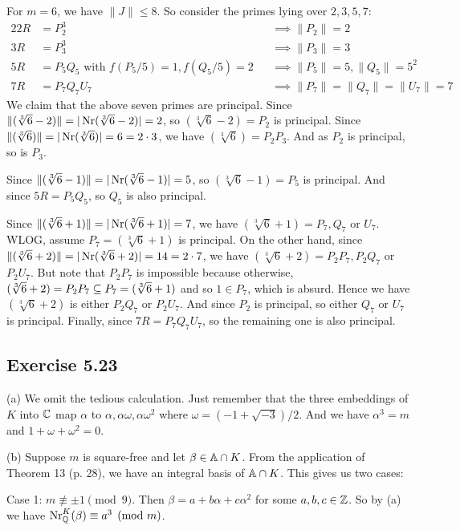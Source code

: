 \documentclass[../Marcus.tex]{subfiles}
\begin{document}
For $m=6$, we have $\|J\| \leq 8$. So consider the primes lying over $2,3,5,7$:
\begin{alignat*}{2}
2R &= P_2^3 &&\implies \|P_2\| = 2   \\
3R &= P_3^3 &&\implies \|P_3\| = 3    \\
5R &= P_5Q_5 \text{ with } f(P_5/5) = 1, f(Q_5/5) = 2 &&\implies \|P_5\| = 5, \|Q_5\| = 5^2    \\
7R &= P_7Q_7U_7 &&\implies \|P_7\| = \|Q_7\| = \|U_7\| = 7
\end{alignat*}
We claim that the above seven primes are principal. Since $\|(\sqrt[3]{6}-2)\| = |\Nr(\sqrt[3]{6}-2)| = 2$, so $(\sqrt[3]{6}-2) = P_2$ is principal. Since $\|(\sqrt[3]{6})\| = |\Nr(\sqrt[3]{6})| = 6 = 2\cdot 3$, we have $(\sqrt[3]{6}) = P_2P_3$. And as $P_2$ is principal, so is $P_3$.

Since $\|(\sqrt[3]{6}-1)\| = |\Nr(\sqrt[3]{6}-1)| = 5$, so $(\sqrt[3]{6}-1) = P_5$ is principal. And since $5R = P_5Q_5$, so $Q_5$ is also principal.

Since $\|(\sqrt[3]{6}+1)\| = |\Nr(\sqrt[3]{6}+1)| = 7$, we have $(\sqrt[3]{6}+1) = P_7,Q_7$ or $U_7$. WLOG, assume $P_7=(\sqrt[3]{6}+1)$ is principal. On the other hand, since $\|(\sqrt[3]{6}+2)\| = |\Nr(\sqrt[3]{6}+2)| = 14 = 2\cdot 7$, we have $(\sqrt[3]{6}+2) = P_2P_7,P_2Q_7$ or $P_2U_7$. But note that $P_2P_7$ is impossible because otherwise, $(\sqrt[3]{6}+2) = P_2P_7 \sbe P_7 = (\sqrt[3]{6}+1)$ and so $1 \in P_7$, which is absurd. Hence we have $(\sqrt[3]{6}+2)$ is either $P_2Q_7$ or $P_2U_7$. And since $P_2$ is principal, so either $Q_7$ or $U_7$ is principal. Finally, since $7R = P_7Q_7U_7$, so the remaining one is also principal.

\subsection*{Exercise 5.23}

(a) We omit the tedious calculation. Just remember that the three embeddings of $K$ into $\CC$ map $\alpha$ to $\alpha,\alpha\omega,\alpha\omega^2$ where $\omega=(-1+\sqrt{-3})/2$. And we have $\alpha^3 = m$ and $1+\omega+\omega^2=0$.

(b) Suppose $m$ is square-free and let $\beta \in \AA \cap K$. From the application of Theorem 13 (p. 28), we have an integral basis of $\AA \cap K$. This gives us two cases:

Case 1: $m\not\equiv\pm1\pmod{9}$. Then $\beta = a+b\alpha+c\alpha^2$ for some $a,b,c\in \ZZ$. So by (a) we have $\NrKQ(\beta) \equiv a^3 \pmod{m}$.
\end{document}
